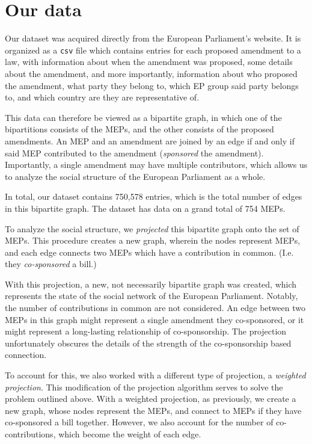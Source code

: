 \documentclass[lettersize,journal]{IEEEtran}
\begin{document}
\section{Our data} \label{sec:data}

Our dataset was acquired directly from the European Parliament's website. It is organized as a \texttt{csv} file which contains entries for each proposed amendment to a law, with information about when the amendment was proposed, some details about the amendment, and more importantly, information about who proposed the amendment, what party they belong to, which EP group said party belongs to, and which country are they are representative of.

This data can therefore be viewed as a bipartite graph, in which one of the bipartitions consists of the MEPs, and the other consists of the proposed amendments. An MEP and an amendment are joined by an edge if and only if said MEP contributed to the amendment (\textit{sponsored} the amendment). Importantly, a single amendment may have multiple contributors, which allows us to analyze the social structure of the European Parliament as a whole.

In total, our dataset contains 750,578 entries, which is the total number of edges in this bipartite graph. The dataset has data on a grand total of 754 MEPs.

To analyze the social structure, we \textit{projected} this bipartite graph onto the set of MEPs. This procedure creates a new graph, wherein the nodes represent MEPs, and each edge connects two MEPs which have a contribution in common. (I.e. they \textit{co-sponsored} a bill.)

With this projection, a new, not necessarily bipartite graph was created, which represents the state of the social network of the European Parliament. Notably, the number of contributions in common are not considered. An edge between two MEPs in this graph might represent a single amendment they co-sponsored, or it might represent a long-lasting relationship of co-sponsorship. The projection unfortunately obscures the details of the strength of the co-sponsorship based connection.

To account for this, we also worked with a different type of projection, a \textit{weighted projection}. This modification of the projection algorithm serves to solve the problem outlined above. With a weighted projection, as previously, we create a new graph, whose nodes represent the MEPs, and connect to MEPs if they have co-sponsored a bill together. However, we also account for the number of co-contributions, which become the weight of each edge.
\end{document}
